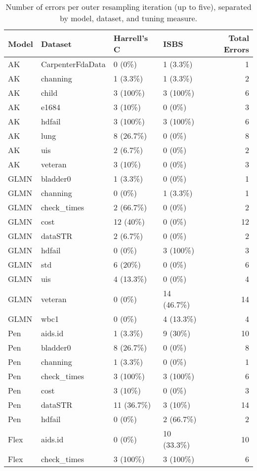\begin{table}
\centering
\caption{Number of errors per outer resampling iteration (up to five), separated by model, dataset, and tuning measure.}
\centering
\begin{tabular}[t]{llllr}
\toprule
Model & Dataset & Harrell's C & ISBS & Total Errors\\
\midrule
AK & CarpenterFdaData & 0 (0\%) & 1 (3.3\%) & 1\\
AK & channing & 1 (3.3\%) & 1 (3.3\%) & 2\\
AK & child & 3 (100\%) & 3 (100\%) & 6\\
AK & e1684 & 3 (10\%) & 0 (0\%) & 3\\
AK & hdfail & 3 (100\%) & 3 (100\%) & 6\\
AK & lung & 8 (26.7\%) & 0 (0\%) & 8\\
AK & uis & 2 (6.7\%) & 0 (0\%) & 2\\
AK & veteran & 3 (10\%) & 0 (0\%) & 3\\
GLMN & bladder0 & 1 (3.3\%) & 0 (0\%) & 1\\
GLMN & channing & 0 (0\%) & 1 (3.3\%) & 1\\
GLMN & check\_times & 2 (66.7\%) & 0 (0\%) & 2\\
GLMN & cost & 12 (40\%) & 0 (0\%) & 12\\
GLMN & dataSTR & 2 (6.7\%) & 0 (0\%) & 2\\
GLMN & hdfail & 0 (0\%) & 3 (100\%) & 3\\
GLMN & std & 6 (20\%) & 0 (0\%) & 6\\
GLMN & uis & 4 (13.3\%) & 0 (0\%) & 4\\
GLMN & veteran & 0 (0\%) & 14 (46.7\%) & 14\\
GLMN & wbc1 & 0 (0\%) & 4 (13.3\%) & 4\\
Pen & aids.id & 1 (3.3\%) & 9 (30\%) & 10\\
Pen & bladder0 & 8 (26.7\%) & 0 (0\%) & 8\\
Pen & channing & 1 (3.3\%) & 0 (0\%) & 1\\
Pen & check\_times & 3 (100\%) & 3 (100\%) & 6\\
Pen & cost & 3 (10\%) & 0 (0\%) & 3\\
Pen & dataSTR & 11 (36.7\%) & 3 (10\%) & 14\\
Pen & hdfail & 0 (0\%) & 2 (66.7\%) & 2\\
Flex & aids.id & 0 (0\%) & 10 (33.3\%) & 10\\
Flex & check\_times & 3 (100\%) & 3 (100\%) & 6\\

\end{tabular}
\end{table}
